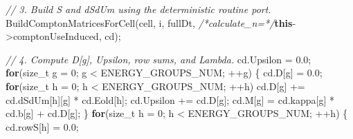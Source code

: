 \documentclass[
]{article}
\newenvironment{Shaded}{}{}
\newcommand{\CommentTok}[1]{\textcolor[rgb]{0.38,0.63,0.69}{\textit{#1}}}
\newcommand{\ControlFlowTok}[1]{\textcolor[rgb]{0.00,0.44,0.13}{\textbf{#1}}}
\newcommand{\DataTypeTok}[1]{\textcolor[rgb]{0.56,0.13,0.00}{#1}}
\newcommand{\DecValTok}[1]{\textcolor[rgb]{0.25,0.63,0.44}{#1}}
\newcommand{\FloatTok}[1]{\textcolor[rgb]{0.25,0.63,0.44}{#1}}
\newcommand{\KeywordTok}[1]{\textcolor[rgb]{0.00,0.44,0.13}{\textbf{#1}}}
\newcommand{\NormalTok}[1]{#1}
\newcommand{\OperatorTok}[1]{\textcolor[rgb]{0.40,0.40,0.40}{#1}}
\begin{document}
\begin{Shaded}
\begin{Highlighting}[]
        \CommentTok{// 3. Build S and dSdUm using the deterministic routine port.}
\NormalTok{        BuildComptonMatricesForCell}\OperatorTok{(}\NormalTok{cell}\OperatorTok{,}\NormalTok{ i}\OperatorTok{,}\NormalTok{ fullDt}\OperatorTok{,} \CommentTok{/*calculate\_n=*/}\KeywordTok{this}\OperatorTok{{-}\textgreater{}}\NormalTok{comptonUseInduced}\OperatorTok{,}\NormalTok{ cd}\OperatorTok{);}

        \CommentTok{// 4. Compute D[g], Upsilon, row sums, and Lambda.}
\NormalTok{        cd}\OperatorTok{.}\NormalTok{Upsilon }\OperatorTok{=} \FloatTok{0.0}\OperatorTok{;}
        \ControlFlowTok{for}\OperatorTok{(}\DataTypeTok{size\_t}\NormalTok{ g }\OperatorTok{=} \DecValTok{0}\OperatorTok{;}\NormalTok{ g }\OperatorTok{\textless{}}\NormalTok{ ENERGY\_GROUPS\_NUM}\OperatorTok{;} \OperatorTok{++}\NormalTok{g}\OperatorTok{)}
        \OperatorTok{\{}
\NormalTok{            cd}\OperatorTok{.}\NormalTok{D}\OperatorTok{[}\NormalTok{g}\OperatorTok{]} \OperatorTok{=} \FloatTok{0.0}\OperatorTok{;}
            \ControlFlowTok{for}\OperatorTok{(}\DataTypeTok{size\_t}\NormalTok{ h }\OperatorTok{=} \DecValTok{0}\OperatorTok{;}\NormalTok{ h }\OperatorTok{\textless{}}\NormalTok{ ENERGY\_GROUPS\_NUM}\OperatorTok{;} \OperatorTok{++}\NormalTok{h}\OperatorTok{)}
\NormalTok{                cd}\OperatorTok{.}\NormalTok{D}\OperatorTok{[}\NormalTok{g}\OperatorTok{]} \OperatorTok{+=}\NormalTok{ cd}\OperatorTok{.}\NormalTok{dSdUm}\OperatorTok{[}\NormalTok{h}\OperatorTok{][}\NormalTok{g}\OperatorTok{]} \OperatorTok{*}\NormalTok{ cd}\OperatorTok{.}\NormalTok{Eold}\OperatorTok{[}\NormalTok{h}\OperatorTok{];}
\NormalTok{            cd}\OperatorTok{.}\NormalTok{Upsilon }\OperatorTok{+=}\NormalTok{ cd}\OperatorTok{.}\NormalTok{D}\OperatorTok{[}\NormalTok{g}\OperatorTok{];}
\NormalTok{            cd}\OperatorTok{.}\NormalTok{M}\OperatorTok{[}\NormalTok{g}\OperatorTok{]} \OperatorTok{=}\NormalTok{ cd}\OperatorTok{.}\NormalTok{kappa}\OperatorTok{[}\NormalTok{g}\OperatorTok{]} \OperatorTok{*}\NormalTok{ cd}\OperatorTok{.}\NormalTok{b}\OperatorTok{[}\NormalTok{g}\OperatorTok{]} \OperatorTok{+}\NormalTok{ cd}\OperatorTok{.}\NormalTok{D}\OperatorTok{[}\NormalTok{g}\OperatorTok{];}
        \OperatorTok{\}}
        \ControlFlowTok{for}\OperatorTok{(}\DataTypeTok{size\_t}\NormalTok{ h }\OperatorTok{=} \DecValTok{0}\OperatorTok{;}\NormalTok{ h }\OperatorTok{\textless{}}\NormalTok{ ENERGY\_GROUPS\_NUM}\OperatorTok{;} \OperatorTok{++}\NormalTok{h}\OperatorTok{)}
        \OperatorTok{\{}
\NormalTok{            cd}\OperatorTok{.}\NormalTok{rowS}\OperatorTok{[}\NormalTok{h}\OperatorTok{]} \OperatorTok{=} \FloatTok{0.0}\OperatorTok{;}

\end{Highlighting}
\end{Shaded}
\end{document}
